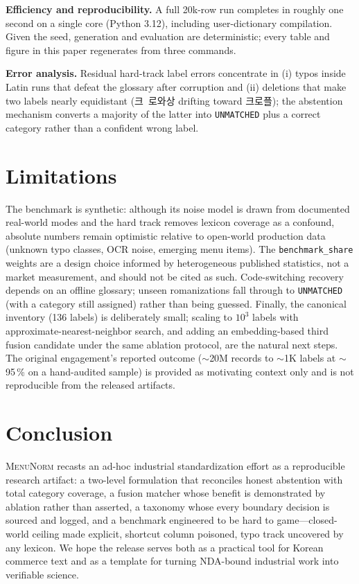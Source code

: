 \documentclass[10pt,twocolumn]{article}
\newcommand{\menunorm}{\textsc{MenuNorm}}
\newcommand{\unmatched}{\texttt{UNMATCHED}}
\begin{document}
\textbf{Efficiency and reproducibility.} A full 20k-row run completes in
roughly one second on a single core (Python 3.12), including user-dictionary
compilation. Given the seed, generation and evaluation are deterministic;
every table and figure in this paper regenerates from three commands.

\textbf{Error analysis.} Residual hard-track label errors concentrate in
(i) typos inside Latin runs that defeat the glossary after corruption and
(ii) deletions that make two labels nearly equidistant
(\mbox{크 로와상} drifting toward 크로플); the abstention mechanism converts
a majority of the latter into \unmatched{} plus a correct category rather
than a confident wrong label.

\section{Limitations}
\label{sec:limitations}

The benchmark is synthetic: although its noise model is drawn from
documented real-world modes and the hard track removes lexicon coverage as
a confound, absolute numbers remain optimistic relative to open-world
production data (unknown typo classes, OCR noise, emerging menu items).
The \texttt{benchmark\_share} weights are a design choice informed by
heterogeneous published statistics, not a market measurement, and should
not be cited as such. Code-switching recovery depends on an offline
glossary; unseen romanizations fall through to \unmatched{} (with a
category still assigned) rather than being guessed. Finally, the canonical
inventory (136 labels) is deliberately small; scaling to $10^3$ labels with
approximate-nearest-neighbor search, and adding an embedding-based third
fusion candidate under the same ablation protocol, are the natural next
steps. The original engagement's reported outcome ($\sim$20M records to
$\sim$1K labels at $\sim$95\,\% on a hand-audited sample) is provided as
motivating context only and is not reproducible from the released
artifacts.

\section{Conclusion}

\menunorm{} recasts an ad-hoc industrial standardization effort as a
reproducible research artifact: a two-level formulation that reconciles
honest abstention with total category coverage, a fusion matcher whose
benefit is demonstrated by ablation rather than asserted, a taxonomy whose
every boundary decision is sourced and logged, and a benchmark engineered to
be hard to game---closed-world ceiling made explicit, shortcut column
poisoned, typo track uncovered by any lexicon. We hope the release serves
both as a practical tool for Korean commerce text and as a template for
turning NDA-bound industrial work into verifiable science.
\end{document}
